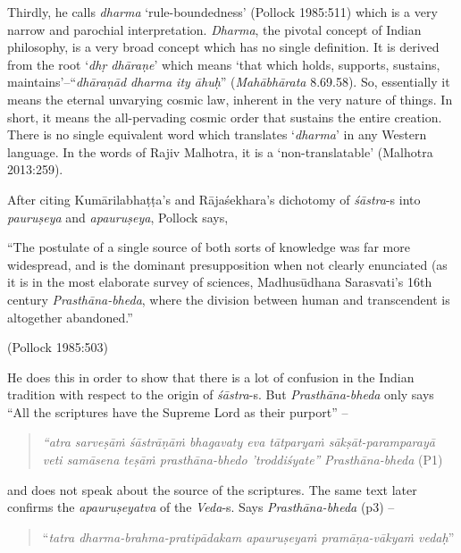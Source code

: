 Thirdly, he calls {\it dharma} `rule-boundedness' (Pollock 1985:511) which is a very narrow and parochial interpretation. {\it Dharma}, the pivotal concept of Indian philosophy, is a very broad concept which has no single definition. It is derived from the root `\textsl{dhṛ dhāraṇe}' which means `that which holds, supports, sustains, maintains'--``\textsl{dhāraṇād dharma ity āhuḥ}'' ({\it Mahābhārata} 8.69.58). So, essentially it means the eternal unvarying cosmic law, inherent in the very nature of things. In short, it means the all-pervading cosmic order that sustains the entire creation. There is no single equivalent word which translates `{\it dharma}' in any Western language. In the words of Rajiv Malhotra, it is a `non-translatable' (Malhotra 2013:259).

After citing Kumārilabhaṭṭa's and Rājaśekhara's dichotomy of {\it śāstra}-s into {\it pauruṣeya} and {\it apauruṣeya}, Pollock says,
\begin{myquote}
``The postulate of a single source of both sorts of knowledge was far more widespread, and is the dominant presupposition when not clearly enunciated (as it is in the most elaborate survey of sciences, Madhusūdhana Sarasvati's 16th century {\sl Prasthāna-bheda}, where the division between human and transcendent is altogether abandoned.'' 

\hfill (Pollock 1985:503)
\end{myquote}

He does this in order to show that there is a lot of confusion in the Indian tradition with respect to the origin of {\sl śāstra}-s. But {\sl Prasthāna-bheda} only says ``All the scriptures have the Supreme Lord as their purport'' -- 
\begin{quote}
{{\sl ``atra sarveṣāṁ śāstrāṇāṁ bhagavaty eva tātparyaṁ sākṣāt-\break paramparayā veti samāsena teṣāṁ prasthāna-bhedo 'troddiśyate''}}  {\sl Prasthāna-bheda} (P1) 
\end{quote}
\noindent
and does not speak about the source of the scriptures. The same text later confirms the {\sl apauruṣeyatva} of the {\sl Veda}-s. Says {\sl Prasthāna-bheda} (p3) -- 
\begin{quote}
``{{\sl tatra dharma-brahma-pratipādakam apauruṣeyaṁ pramāṇa-vākyaṁ vedaḥ}}'' 
\end{quote}

